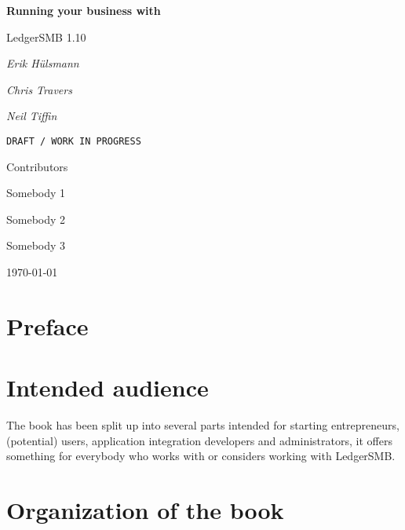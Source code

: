\documentclass[10pt,a4paper]{book}
\newcommand{\ledgerSMBversion}{1.10 }
\begin{document}



\begin{titlepage}
	\centering
	
	\large{\textbf{Running your business with}} \par
	
	\LARGE LedgerSMB \ledgerSMBversion \par
	\vspace{1cm}
	{\Large\itshape Erik H\"ulsmann\par}
	{\Large\itshape Chris Travers\par}
	{\Large\itshape Neil Tiffin\par}
	\vspace{1cm}
	\texttt{DRAFT / WORK IN PROGRESS} \par	
	\vspace{1cm}	
	{\large Contributors\par}
	{\normalsize Somebody 1\par}
	{\normalsize Somebody 2\par}
	{\normalsize Somebody 3\par}
	\vfill
	
	{\large \today\par}
\end{titlepage}

\tableofcontents

\listoffigures

\listoftables

\printglossaries

\cleardoublepage

\section*{Preface}
\label{preface}

\section*{Intended audience}
\label{sec-intended-audience}

The book has been split up into several parts intended for starting entrepreneurs,
(potential) users, application integration developers and
administrators, it offers something for everybody who works with or considers working with
LedgerSMB.

\section*{Organization of the book}
\label{sec-book-organization}
\end{document}
